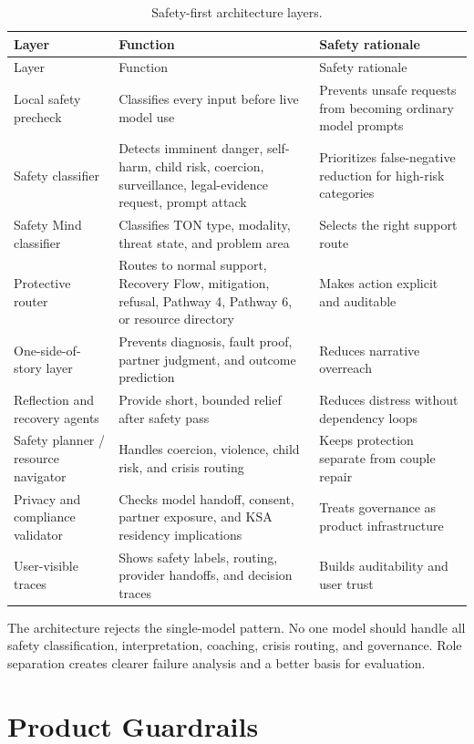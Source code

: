 \documentclass[11pt]{article}
\begin{document}
\begin{longtable}{p{}p{}p{}}
\caption{Safety-first architecture layers.}\\
\toprule
Layer & Function & Safety rationale \\
\midrule
\endfirsthead
\toprule
Layer & Function & Safety rationale \\
\midrule
\endhead
Local safety precheck & Classifies every input before live model use & Prevents unsafe requests from becoming ordinary model prompts \\
Safety classifier & Detects imminent danger, self-harm, child risk, coercion, surveillance, legal-evidence request, prompt attack & Prioritizes false-negative reduction for high-risk categories \\
Safety Mind classifier & Classifies TON type, modality, threat state, and problem area & Selects the right support route \\
Protective router & Routes to normal support, Recovery Flow, mitigation, refusal, Pathway 4, Pathway 6, or resource directory & Makes action explicit and auditable \\
One-side-of-story layer & Prevents diagnosis, fault proof, partner judgment, and outcome prediction & Reduces narrative overreach \\
Reflection and recovery agents & Provide short, bounded relief after safety pass & Reduces distress without dependency loops \\
Safety planner / resource navigator & Handles coercion, violence, child risk, and crisis routing & Keeps protection separate from couple repair \\
Privacy and compliance validator & Checks model handoff, consent, partner exposure, and KSA residency implications & Treats governance as product infrastructure \\
User-visible traces & Shows safety labels, routing, provider handoffs, and decision traces & Builds auditability and user trust \\
\bottomrule
\end{longtable}

The architecture rejects the single-model pattern. No one model should handle all safety classification, interpretation, coaching, crisis routing, and governance. Role separation creates clearer failure analysis and a better basis for evaluation.

\section{Product Guardrails}
\end{document}
